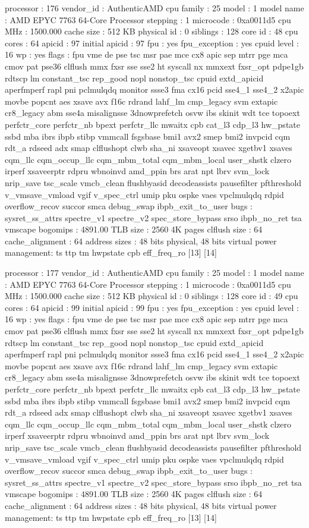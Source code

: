 processor	: 176
vendor_id	: AuthenticAMD
cpu family	: 25
model		: 1
model name	: AMD EPYC 7763 64-Core Processor
stepping	: 1
microcode	: 0xa0011d5
cpu MHz		: 1500.000
cache size	: 512 KB
physical id	: 0
siblings	: 128
core id		: 48
cpu cores	: 64
apicid		: 97
initial apicid	: 97
fpu		: yes
fpu_exception	: yes
cpuid level	: 16
wp		: yes
flags		: fpu vme de pse tsc msr pae mce cx8 apic sep mtrr pge mca cmov pat pse36 clflush mmx fxsr sse sse2 ht syscall nx mmxext fxsr_opt pdpe1gb rdtscp lm constant_tsc rep_good nopl nonstop_tsc cpuid extd_apicid aperfmperf rapl pni pclmulqdq monitor ssse3 fma cx16 pcid sse4_1 sse4_2 x2apic movbe popcnt aes xsave avx f16c rdrand lahf_lm cmp_legacy svm extapic cr8_legacy abm sse4a misalignsse 3dnowprefetch osvw ibs skinit wdt tce topoext perfctr_core perfctr_nb bpext perfctr_llc mwaitx cpb cat_l3 cdp_l3 hw_pstate ssbd mba ibrs ibpb stibp vmmcall fsgsbase bmi1 avx2 smep bmi2 invpcid cqm rdt_a rdseed adx smap clflushopt clwb sha_ni xsaveopt xsavec xgetbv1 xsaves cqm_llc cqm_occup_llc cqm_mbm_total cqm_mbm_local user_shstk clzero irperf xsaveerptr rdpru wbnoinvd amd_ppin brs arat npt lbrv svm_lock nrip_save tsc_scale vmcb_clean flushbyasid decodeassists pausefilter pfthreshold v_vmsave_vmload vgif v_spec_ctrl umip pku ospke vaes vpclmulqdq rdpid overflow_recov succor smca debug_swap ibpb_exit_to_user
bugs		: sysret_ss_attrs spectre_v1 spectre_v2 spec_store_bypass srso ibpb_no_ret tsa vmscape
bogomips	: 4891.00
TLB size	: 2560 4K pages
clflush size	: 64
cache_alignment	: 64
address sizes	: 48 bits physical, 48 bits virtual
power management: ts ttp tm hwpstate cpb eff_freq_ro [13] [14]

processor	: 177
vendor_id	: AuthenticAMD
cpu family	: 25
model		: 1
model name	: AMD EPYC 7763 64-Core Processor
stepping	: 1
microcode	: 0xa0011d5
cpu MHz		: 1500.000
cache size	: 512 KB
physical id	: 0
siblings	: 128
core id		: 49
cpu cores	: 64
apicid		: 99
initial apicid	: 99
fpu		: yes
fpu_exception	: yes
cpuid level	: 16
wp		: yes
flags		: fpu vme de pse tsc msr pae mce cx8 apic sep mtrr pge mca cmov pat pse36 clflush mmx fxsr sse sse2 ht syscall nx mmxext fxsr_opt pdpe1gb rdtscp lm constant_tsc rep_good nopl nonstop_tsc cpuid extd_apicid aperfmperf rapl pni pclmulqdq monitor ssse3 fma cx16 pcid sse4_1 sse4_2 x2apic movbe popcnt aes xsave avx f16c rdrand lahf_lm cmp_legacy svm extapic cr8_legacy abm sse4a misalignsse 3dnowprefetch osvw ibs skinit wdt tce topoext perfctr_core perfctr_nb bpext perfctr_llc mwaitx cpb cat_l3 cdp_l3 hw_pstate ssbd mba ibrs ibpb stibp vmmcall fsgsbase bmi1 avx2 smep bmi2 invpcid cqm rdt_a rdseed adx smap clflushopt clwb sha_ni xsaveopt xsavec xgetbv1 xsaves cqm_llc cqm_occup_llc cqm_mbm_total cqm_mbm_local user_shstk clzero irperf xsaveerptr rdpru wbnoinvd amd_ppin brs arat npt lbrv svm_lock nrip_save tsc_scale vmcb_clean flushbyasid decodeassists pausefilter pfthreshold v_vmsave_vmload vgif v_spec_ctrl umip pku ospke vaes vpclmulqdq rdpid overflow_recov succor smca debug_swap ibpb_exit_to_user
bugs		: sysret_ss_attrs spectre_v1 spectre_v2 spec_store_bypass srso ibpb_no_ret tsa vmscape
bogomips	: 4891.00
TLB size	: 2560 4K pages
clflush size	: 64
cache_alignment	: 64
address sizes	: 48 bits physical, 48 bits virtual
power management: ts ttp tm hwpstate cpb eff_freq_ro [13] [14]

